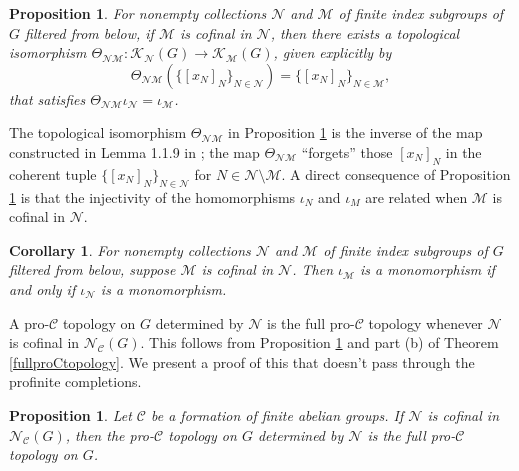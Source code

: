 \documentclass{amsart}
\theoremstyle{plain}
\newtheorem{corollary}[theorem]{Corollary}
\newtheorem{proposition}[theorem]{Proposition}
\theoremstyle{definition}
\theoremstyle{remark}
\begin{document}
\begin{proposition}\label{topisoiota} For nonempty collections ${\mathcal N}$ and ${\mathcal M}$ of finite index subgroups of $G$ filtered from below, if ${\mathcal M}$ is cofinal in ${\mathcal N}$, then there exists a topological isomorphism $\Theta_{\mathcal{NM}}: {\mathcal K}_{\mathcal N}(G) \to {\mathcal K}_{\mathcal M}(G)$, given explicitly by
\[ \Theta_{ \mathcal{NM}} ( \{ [x_N]_N\}_{N\in{\mathcal N}}) = \{ [x_N]_N\}_{N\in{\mathcal M}},\]
that satisfies $\Theta_{\mathcal {NM}}\iota_{\mathcal N} = \iota_{\mathcal M}$.
\end{proposition}

The topological isomorphism $\Theta_{ {\mathcal N}{\mathcal M}}$ in Proposition \ref{topisoiota} is the inverse of the map constructed in Lemma 1.1.9 in \cite{RZ10}; the map $\Theta_{{\mathcal N}{\mathcal M}}$ ``forgets'' those $[x_N]_N$ in the coherent tuple $\{ [x_N]_N\}_ {N\in{ {\mathcal N}}}$ for $N\in {\mathcal N}\setminus{\mathcal M}$. A direct consequence of Proposition \ref{topisoiota} is that the injectivity of the homomorphisms $\iota_N$ and $\iota_M$ are related when ${\mathcal M}$ is cofinal in ${\mathcal N}$.

\begin{corollary}\label{iotainjective} For nonempty collections ${\mathcal N}$ and ${\mathcal M}$ of finite index subgroups of $G$ filtered from below, suppose ${\mathcal M}$ is cofinal in ${\mathcal N}$. Then $\iota_{\mathcal M}$ is a monomorphism if and only if $\iota_{\mathcal N}$ is a monomorphism.
\end{corollary}

A pro-${\mathcal C}$ topology on $G$ determined by ${\mathcal N}$ is the full pro-${\mathcal C}$ topology whenever ${\mathcal N}$ is cofinal in ${\mathcal N}_{\mathcal C}(G)$. This follows from Proposition \ref{topisoiota} and part (b) of Theorem \ref{fullproCtopology}. We present a proof of this that doesn't pass through the profinite completions.

\begin{proposition}\label{fullprofinite} Let ${\mathcal C}$ be a formation of finite abelian groups. If ${\mathcal N}$ is cofinal in ${\mathcal N}_{\mathcal C}(G)$, then the pro-${\mathcal C}$ topology on $G$ determined by ${\mathcal N}$ is the full pro-${\mathcal C}$ topology on $G$. 
\end{proposition}
\end{document}
